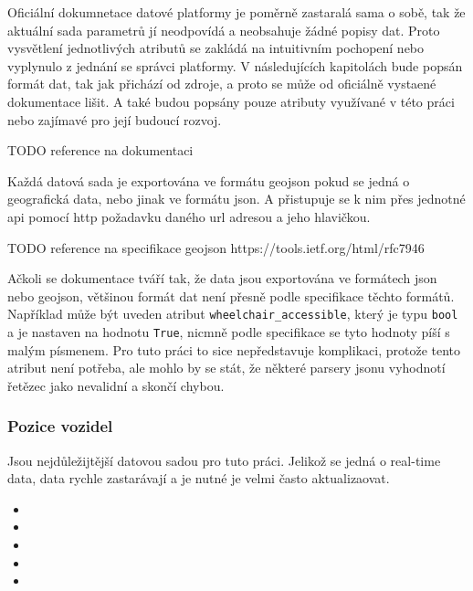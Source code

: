 \bigbreak

Oficiální dokumnetace datové platformy je poměrně zastaralá sama o sobě, tak že aktuální sada parametrů jí neodpovídá a neobsahuje žádné popisy dat. Proto vysvětlení jednotlivých atributů se zakládá na intuitivním pochopení nebo vyplynulo z jednání se správci platformy. V následujících kapitolách bude popsán formát dat, tak jak přichází od zdroje, a proto se může od oficiálně vystaené dokumentace lišit. A také budou popsány pouze atributy využívané v této práci nebo zajímavé pro její budoucí rozvoj.

TODO reference na dokumentaci

\bigbreak

Každá datová sada je exportována ve formátu \gls{geojson} pokud se jedná o geografická data, nebo jinak ve formátu \gls{json}. A přistupuje se k nim přes jednotné \gls{api} pomocí \gls{http} požadavku daného \gls{url} adresou a jeho hlavičkou.

TODO reference na specifikace geojson https://tools.ietf.org/html/rfc7946

\bigbreak

Ačkoli se dokumentace tváří tak, že data jsou exportována ve formátech \gls{json} nebo \gls{geojson}, většinou formát dat není přesně podle specifikace těchto formátů. Například může být uveden atribut \verb"wheelchair_accessible", který je typu \verb"bool" a je nastaven na hodnotu \verb"True", nicmně podle specifikace se tyto hodnoty píší s malým písmenem. Pro tuto práci to sice nepředstavuje komplikaci, protože tento atribut není potřeba, ale mohlo by se stát, že některé parsery \gls{json}u vyhodnotí řetězec jako nevalidní a skončí chybou.

\subsubsection{Pozice vozidel}

Jsou nejdůležijtější datovou sadou pro tuto práci. Jelikož se jedná o real-time data, data rychle zastarávají a je nutné je velmi často aktualizaovat.

\begin{itemize}
	\item {}

	\item {}

	\item {}

	\item {}

	\item {}
\end{itemize}

